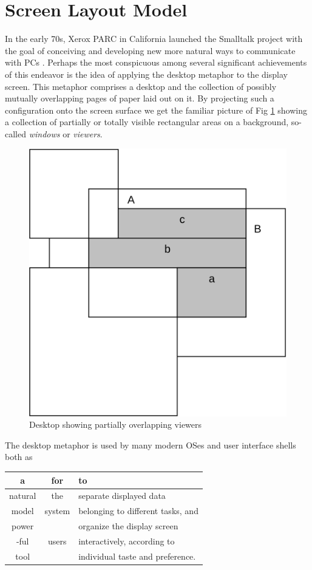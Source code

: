 \section{Screen Layout Model}
In the early 70s, Xerox PARC in California launched the Smalltalk project with the goal of
conceiving and developing new more natural ways to communicate with PCs \cite{Goldberg}.
Perhaps the most conspicuous among several significant achievements of this endeavor is the
idea of applying the desktop metaphor to the display screen. This metaphor comprises a desktop
and the collection of possibly mutually overlapping pages of paper laid out on it. By projecting
such a configuration onto the screen surface we get the familiar picture of Fig \ref{fig:desktop}
showing a collection of partially or totally visible rectangular areas on a background,
so-called \emph{windows} or \emph{viewers}.
\begin{figure}[h!]
  \centering
  \includegraphics[width=.6\textwidth]{i/4}
  \caption{Desktop showing partially overlapping viewers}
  \label{fig:desktop}
\end{figure}

The desktop metaphor is used by many modern OSes and user interface shells both as
\begin{table}[h!]
  \centering
  \begin{tabular}{c c l}
    a       & for    & to \\\hline
    natural & the    & separate displayed data \\
    model   & system & belonging to different tasks, and \\\hline
    power   &        & organize the display screen \\
    -ful    & users  & interactively, according to \\
    tool    &        & individual taste and preference.
  \end{tabular}
\end{table}

